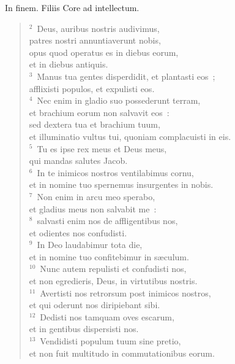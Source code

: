 \bchapter
\lettrine[lines=3,image=true,loversize=0.05,lraise=-0.03]{I}{}n finem. Filiis Core ad intellectum.
\begin{flushleft}\begin{verse}\vspace{6pt}${}^{2}$~Deus, auribus nostris audivimus,\\ patres nostri annuntiaverunt nobis,\\ opus quod operatus es in diebus eorum,\\ et in diebus antiquis.\\
${}^{3}$~Manus tua gentes disperdidit, et plantasti eos~;\\ afflixisti populos, et expulisti eos.\\
${}^{4}$~Nec enim in gladio suo possederunt terram,\\ et brachium eorum non salvavit eos~:\\ sed dextera tua et brachium tuum,\\ et illuminatio vultus tui, quoniam complacuisti in eis.\\
${}^{5}$~Tu es ipse rex meus et Deus meus,\\ qui mandas salutes Jacob.\\
${}^{6}$~In te inimicos nostros ventilabimus cornu,\\ et in nomine tuo spernemus insurgentes in nobis.\\
${}^{7}$~Non enim in arcu meo sperabo,\\ et gladius meus non salvabit me~:\\
${}^{8}$~salvasti enim nos de affligentibus nos,\\ et odientes nos confudisti.\\
${}^{9}$~In Deo laudabimur tota die,\\ et in nomine tuo confitebimur in s\ae culum.\\
${}^{10}$~Nunc autem repulisti et confudisti nos,\\ et non egredieris, Deus, in virtutibus nostris.\\
${}^{11}$~Avertisti nos retrorsum post inimicos nostros,\\ et qui oderunt nos diripiebant sibi.\\
${}^{12}$~Dedisti nos tamquam oves escarum,\\ et in gentibus dispersisti nos.\\
${}^{13}$~Vendidisti populum tuum sine pretio,\\ et non fuit multitudo in commutationibus eorum.\\

\end{verse}
\end{flushleft}
